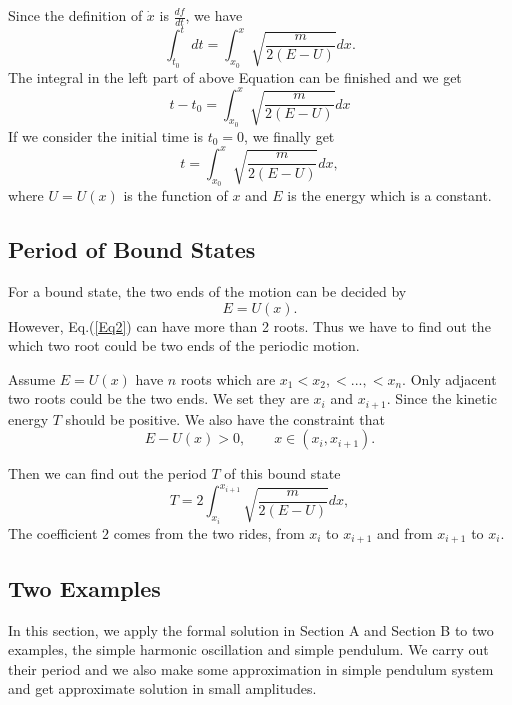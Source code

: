\documentclass[%
 reprint,
 amsmath,amssymb,
 aps,
]{revtex4-1}
\begin{document}
Since the definition of $\dot{x}$ is $\frac{d f}{dt}$,
we have
\begin{equation}
    \int_{t_0}^{t} dt=\int_{x_0}^{x}\sqrt{\frac{m}{2(E-U)}}dx.
\end{equation}
The integral in the left part of above Equation can be finished and we get
\begin{equation}
    t-t_0=\int_{x_0}^{x}\sqrt{\frac{m}{2(E-U)}}dx
\end{equation}
If we consider the initial time is $t_0=0$, we finally get
\begin{equation}
    t=\int_{x_0}^{x}\sqrt{\frac{m}{2(E-U)}}dx,
\end{equation}
where $U=U(x)$ is the function of $x$ and $E$ is the energy which is a constant.



\subsection{\label{sec:level2} Period of Bound States}
For a bound state, the two ends of the motion can be decided by
\begin{equation}
    E=U(x).
\label{Eq2}
\end{equation}
However, Eq.(\ref{Eq2}) can have more than 2 roots. Thus we have to find out the which two root could be two ends of the periodic motion.

Assume $E=U(x)$ have $n$ roots which are $x_1<x_2,<...,<x_n$. Only adjacent two roots could be the two ends. We set they are $x_i$ and $x_{i+1}$. Since the kinetic energy $T$ should be positive. We also have the constraint that
\begin{equation}
    E-U(x)>0,\qquad x\in(x_i,x_{i+1}).
\end{equation}

Then we can find out the period $T$ of this bound state
\begin{equation}
   T=2\int_{x_i}^{x_{i+1}} \sqrt{\frac{m}{2(E-U)}}dx,
\label{Eq.4}
\end{equation}
The coefficient $2$ comes from the two rides, from $x_i$ to $x_{i+1}$ and from $x_{i+1}$ to $x_i$.



\subsection{\label{sec:citeref}Two Examples}
In this section, we apply the formal solution in Section A and Section B to two examples, the simple harmonic oscillation and simple pendulum. We carry out their period and we also make some approximation in simple pendulum system and get approximate solution in small amplitudes. 
\end{document}
